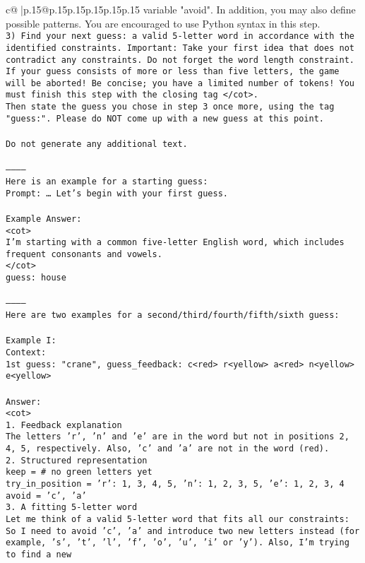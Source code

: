 \documentclass{article}
\begin{document}
{\begin{supertabular}{c@{$\;$}|p{.15\linewidth}@{}p{.15\linewidth}p{.15\linewidth}p{.15\linewidth}p{.15\linewidth}p{.15\linewidth}}
{{{variable "avoid". In addition, you may also define possible patterns. You are encouraged to use Python syntax in this step.\\ \tt 3) Find your next guess: a valid 5-letter word in accordance with the identified constraints. Important: Take your first idea that does not contradict any constraints. Do not forget the word length constraint. If your guess consists of more or less than five letters, the game will be aborted! Be concise; you have a limited number of tokens! You must finish this step with the closing tag </cot>.\\ \tt Then state the guess you chose in step 3 once more, using the tag "guess:". Please do NOT come up with a new guess at this point.\\ \tt \\ \tt Do not generate any additional text.\\ \tt \\ \tt -----------\\ \tt Here is an example for a starting guess:\\ \tt Prompt: … Let's begin with your first guess.\\ \tt \\ \tt Example Answer:\\ \tt <cot>\\ \tt I'm starting with a common five-letter English word, which includes frequent consonants and vowels.\\ \tt </cot>\\ \tt guess: house\\ \tt \\ \tt -----------\\ \tt Here are two examples for a second/third/fourth/fifth/sixth guess:\\ \tt \\ \tt Example I:\\ \tt Context:\\ \tt 1st guess: "crane", guess_feedback: c<red> r<yellow> a<red> n<yellow> e<yellow>\\ \tt \\ \tt Answer:\\ \tt <cot>\\ \tt 1. Feedback explanation\\ \tt The letters 'r', 'n' and 'e' are in the word but not in positions 2, 4, 5, respectively. Also, 'c' and 'a' are not in the word (red).\\ \tt 2. Structured representation\\ \tt keep = {}  # no green letters yet\\ \tt try_in_position = {'r': {1, 3, 4, 5}, 'n': {1, 2, 3, 5}, 'e': {1, 2, 3, 4}}\\ \tt avoid = {'c', 'a'}\\ \tt 3. A fitting 5-letter word\\ \tt Let me think of a valid 5-letter word that fits all our constraints: So I need to avoid {'c', 'a'} and introduce two new letters instead (for example, 's', 't', 'l', 'f', 'o', 'u', 'i' or 'y'). Also, I'm trying to find a new }}}
\end{supertabular}}
\end{document}
